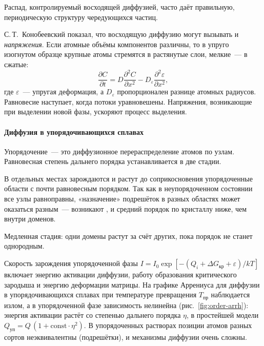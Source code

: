 Распад, контролируемый восходящей диффузией, часто даёт правильную,
периодическую структуру чередующихся частиц.

С.\,Т.~Конобеевский показал, что восходящую диффузию могут вызывать и
\emph{напряжения}. Если атомные объёмы компонентов различны, то в
упруго изогнутом образце крупные атомы стремятся в растянутые слои,
мелкие~— в сжатые:
\begin{equation}\label{eq:konobeevsky}
\frac{\partial C}{\partial t}=D\frac{\partial^2C}{\partial x^2}-D_\varepsilon\frac{\partial^2\varepsilon}{\partial x^2},
\end{equation}
где $\varepsilon$~— упругая деформация, а $D_\varepsilon$ пропорционален
разнице атомных радиусов. Равновесие наступает, когда потоки
уравновешены. Напряжения, возникающие при выделении новой фазы,
ускоряют процесс выделения.

\paragraph{Диффузия в упорядочивающихся сплавах}
Упорядочение~— это диффузионное перераспределение атомов по узлам.
Равновесная степень дальнего порядка устанавливается в две стадии.
\begin{shagi}
\item В отдельных местах зарождаются и растут до соприкосновения
упорядоченные области с почти равновесным порядком. Так как в
неупорядоченном состоянии все узлы равноправны, «назначение» подрешёток
в разных областях может оказаться разным~— возникают , и средний порядок по кристаллу ниже, чем внутри доменов.
\item Медленная стадия: одни домены растут за счёт других, пока порядок
не станет однородным.
\end{shagi}
Скорость зарождения упорядоченной фазы
$I=I_0\exp[-(Q_i+\Delta G_\text{кр}+\varepsilon)/kT]$ включает энергию
активации диффузии, работу образования критического зародыша и энергию
деформации матрицы. На графике Аррениуса для диффузии в
упорядочивающихся сплавах при температуре превращения $T_\text{пр}$
наблюдается излом, а в упорядоченной фазе зависимость нелинейна
(рис.~\ref{fig:order-arrh}): энергия активации растёт со степенью
дальнего порядка $\eta$, в простейшей модели
$Q_\text{уп}=Q\,(1+\text{const}\cdot\eta^2)$. В упорядоченных растворах
позиции атомов разных сортов неэквивалентны (подрешётки), и механизмы
диффузии очень сложны.

